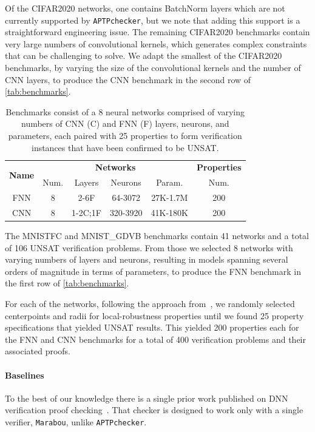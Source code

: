 \documentclass[oneside,11pt,dvipsnames]{book}
\newcommand{\nnproofchecker}{\texttt{APTPchecker}}
\newcommand{\marabou}{\texttt{Marabou}}
\begin{document}
Of the CIFAR2020 networks, one contains BatchNorm layers which are not currently
supported by \nnproofchecker{}, but we note that adding this support is a straightforward
engineering issue.
The remaining CIFAR2020 benchmarks contain very large numbers of convolutional
kernels, which generates complex constraints that can be challenging to solve.
We adapt the smallest of the CIFAR2020 benchmarks, by varying the size of the
convolutional kernels and the number of CNN layers, to produce 
the CNN benchmark in the second row of \autoref{tab:benchmarks}.
\begin{table}[t]
    \footnotesize
    \centering
    \caption{Benchmarks consist of a 8 neural networks comprised of varying numbers of CNN (C) and FNN (F) layers, neurons, and parameters, each paired with 25 properties to form verification instances that have been confirmed to be UNSAT.}\label{tab:benchmarks}
    \begin{tabular}{c|cccc|c}
        \toprule
        \multirow{2}{*}{\textbf{Name}} &\multicolumn{4}{c|}{\textbf{Networks}} & \textbf{Properties}\\
        & Num. & Layers & Neurons & Param. & Num. \\

        \midrule
        FNN        & 8 & 2-6F &  64-3072 & 27K-1.7M & 200  \\
        \midrule
        CNN        & 8 & 1-2C;1F  &  320-3920 & 41K-180K & 200  \\
        \bottomrule
    \end{tabular}
\end{table}

The MNISTFC and MNIST\_GDVB benchmarks contain 41 networks and a total of 106 UNSAT verification problems.
From those we selected 8 networks with varying numbers of layers and neurons, resulting
in models spanning several orders of magnitude in terms of parameters, to produce
the FNN benchmark in the first row of \autoref{tab:benchmarks}.

For each of the networks, following the approach from~\cite{duong2024harnessing}, 
we randomly selected centerpoints and radii for local-robustness properties until we found 25 property specifications that yielded UNSAT results.  This yielded 200 properties
each for the FNN and CNN benchmarks for a total of 400 verification problems and
their associated proofs.

\paragraph{Baselines}
To the best of our knowledge there is a single prior work published
on DNN verification proof checking~\cite{desmartin2023towards}.
That checker is designed to work only with a single verifier, \marabou{}, 
unlike \nnproofchecker{}.
\end{document}
